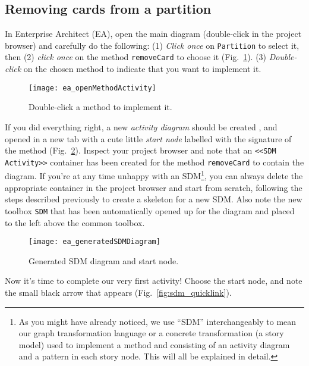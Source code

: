 \subsection{Removing cards from a partition}

In Enterprise Architect (EA), open the main diagram (double-click in the project browser) and carefully do the following: (1) \emph{Click once} on
\texttt{Partition} to select it, then (2) \emph{click once} on the method \texttt{removeCard} to choose it (Fig.~\ref{fig:sdm_start}). (3) \emph{Double-click}
on the chosen method to indicate that you want to implement it.

\begin{figure}[htp]
\begin{center}
  \texttt{[image: ea\_openMethodActivity]}
  \caption{Double-click a method to implement it.}  
  \label{fig:sdm_start}
\end{center}
\end{figure}
 
If you did everything right, a new \emph{activity diagram} should be created , and opened in a new tab with a cute little \emph{start node} 
labelled with the signature of the method (Fig.~\ref{fig:sdm_skeleton}).  Inspect your project browser and note that an \texttt{<<SDM
Activity>>} container has been created for the method \texttt{removeCard} to contain the diagram. If you're at any time unhappy with an SDM\footnote{As you
might have already noticed, we use ``SDM'' interchangeably to mean our graph transformation language or a concrete transformation (a story model) used to
implement a method and consisting of an activity diagram and a pattern in each story node. This will all be explained in detail.}, you can always delete the
appropriate container in the project browser and start from scratch, following the steps described previously to create a skeleton for a new SDM. Also note the
new toolbox \texttt{SDM} that has been automatically opened up for the diagram and placed to the left above the common toolbox.

\begin{figure}[htp]
\begin{center}
  \texttt{[image: ea\_generatedSDMDiagram]}
  \caption{Generated SDM diagram and start node.}  
  \label{fig:sdm_skeleton}
\end{center}
\end{figure}

Now it's time to complete our very first activity! Choose the start node, and note the small black arrow that appears (Fig.~\ref{fig:sdm_quicklink}).

